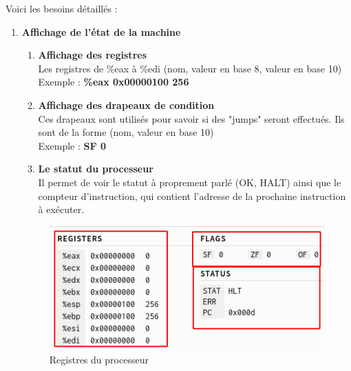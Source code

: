\documentclass[french]{article}
\newcommand{\itembf}[1]{\item \textbf{#1}\\}
\begin{document}
\begin{enumerate}
    Voici les besoins détaillés :
    \begin{enumerate}
            \itembf{Affichage de l'état de la machine}
            \begin{enumerate}
                \itembf{Affichage des registres}
                Les registres de \%eax à \%edi (nom, valeur en base 8, valeur en base 10)\\
                Exemple : \textbf{\%eax 0x00000100 256}
                \itembf{Affichage des drapeaux de condition}
                Ces drapeaux sont utilisés pour savoir si des "jumps" seront effectués. Ils sont de la forme (nom, valeur en base 10)\\
                Exemple : \textbf{SF 0}
                \itembf{Le statut du processeur}
                Il permet de voir le statut à proprement parlé (OK, HALT) ainsi que le compteur d'instruction, qui contient l'adresse de la prochaine instruction à exécuter.
            \end{enumerate}{}
            \begin{figure}[H]
                \centering
                \includegraphics{img/ex_vue_registres.png}
                \caption{Registres du processeur}
                \label{fig:ex_vue_registres}
            \end{figure}
            

\end{enumerate}
\end{enumerate}
\end{document}
